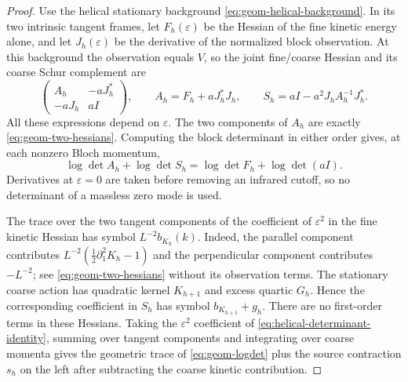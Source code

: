 \documentclass[11pt]{article}
\numberwithin{equation}{section}
\theoremstyle{definition}
\theoremstyle{plain}
\begin{document}
\begin{proof}
Use the helical stationary background
\eqref{eq:geom-helical-background}.  In its two intrinsic tangent
frames, let $F_h(\varepsilon)$ be the Hessian of the fine kinetic
energy alone, and let $J_h(\varepsilon)$ be the derivative of
the normalized block observation.  At this background the
observation equals $V$, so the joint fine/coarse Hessian and its
coarse Schur complement are
\begin{equation}
 \begin{pmatrix}
 A_h&-aJ_h^*\\-aJ_h&aI
 \end{pmatrix},\qquad
 A_h=F_h+aJ_h^*J_h,\qquad
 S_h=aI-a^2J_hA_h^{-1}J_h^*.
 \label{eq:helical-joint-schur}
\end{equation}
All these expressions depend on $\varepsilon$.
The two components of $A_h$ are exactly
\eqref{eq:geom-two-hessians}.  Computing the block determinant
in either order gives, at each nonzero Bloch momentum,
\begin{equation}
 \log\det A_h+\log\det S_h
     =\log\det F_h+\log\det(aI).
 \label{eq:helical-determinant-identity}
\end{equation}
Derivatives at $\varepsilon=0$ are taken before removing an
infrared cutoff, so no determinant of a massless zero mode is
used.

The trace over the two tangent components of the coefficient
of $\varepsilon^2$ in the fine kinetic Hessian has symbol
$L^{-2}b_{K_h}(k)$.  Indeed, the parallel component contributes
$L^{-2}(\tfrac12\partial_1^2K_h-1)$ and the perpendicular
component contributes $-L^{-2}$; see
\eqref{eq:geom-two-hessians} without its observation terms.
The stationary coarse action has quadratic kernel $K_{h+1}$
and excess quartic $G_h$.  Hence the corresponding coefficient
in $S_h$ has symbol $b_{K_{h+1}}+g_h$.
There are no first-order terms in these Hessians.
Taking the $\varepsilon^2$ coefficient of
\eqref{eq:helical-determinant-identity}, summing over tangent
components and integrating over coarse momenta gives the
geometric trace of \eqref{eq:geom-logdet} plus the source
contraction $s_h$ on the left after subtracting the coarse
kinetic contribution.


\end{proof}
\end{document}
